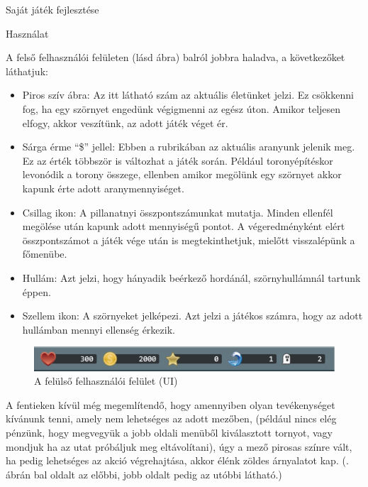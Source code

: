 \begin{MyChapter}{Saját játék fejlesztése}
\begin{MySection}{Használat}
	
		A felső felhasználói felületen (lásd  ábra) balról jobbra haladva, a következőket láthatjuk:
		
		\begin{itemize}
			\item Piros szív ábra: Az itt látható szám az aktuális életünket jelzi. Ez csökkenni fog, ha egy szörnyet engedünk végigmenni az egész úton. Amikor teljesen elfogy, akkor veszítünk, az adott játék véget ér.
			
			\item Sárga érme ``\$'' jellel: Ebben a rubrikában az aktuális aranyunk jelenik meg. Ez az érték többször is változhat a játék során. Például toronyépítéskor levonódik a torony összege, ellenben amikor megölünk egy szörnyet akkor kapunk érte adott aranymennyiséget.
			
			\item Csillag ikon: A pillanatnyi összpontszámunkat mutatja. Minden ellenfél megölése után kapunk adott mennyiségű pontot. A végeredményként elért összpontszámot a játék vége után is megtekinthetjuk, mielőtt visszalépünk a főmenübe.
			
			\item Hullám: Azt jelzi, hogy hányadik beérkező hordánál, szörnyhullámnál tartunk éppen.
			
			\item Szellem ikon: A szörnyeket jelképezi. Azt jelzi a játékos számra, hogy az adott hullámban mennyi ellenség érkezik.
		\end{itemize}
	
		\begin{figure}[H]
			\centering
			\includegraphics[scale=0.58]{kepek/jatekHasznalat/felso_ui}
			\caption{A felülső felhasználói felület (UI) }
			\label{fig:jatekHasznalat:felso_ui}
		\end{figure}
	
		A fentieken kívül még megemlítendő, hogy amennyiben olyan tevékenységet kívánunk tenni, amely nem lehetséges az adott mezőben, (például nincs elég pénzünk, hogy megvegyük a jobb oldali menüből kiválasztott tornyot, vagy mondjuk ha az utat próbáljuk meg eltávolítani), úgy a mező pirosas színre vált, ha pedig lehetséges az akció végrehajtása, akkor élénk zöldes árnyalatot kap. (. ábrán bal oldalt az előbbi, jobb oldalt pedig az utóbbi látható.)
		

\end{MySection}
\end{MyChapter}
